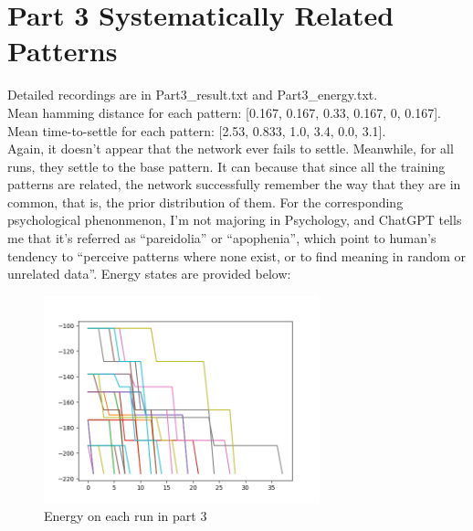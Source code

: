 \documentclass{article}
\begin{document}
\section*{Part 3 Systematically Related Patterns}
Detailed recordings are in Part3\_result.txt and Part3\_energy.txt.\\
Mean hamming distance for each pattern: [0.167, 0.167, 0.33, 0.167, 0, 0.167].\\
Mean time-to-settle for each pattern: [2.53, 0.833, 1.0, 3.4, 0.0, 3.1].\\
Again, it doesn't appear that the network ever fails to settle. Meanwhile, for all runs, they settle to the base pattern.
It can because that since all the training patterns are related, the network successfully remember the way that they are in common, that is, the prior distribution of them.
For the corresponding psychological phenonmenon, I'm not majoring in Psychology, and ChatGPT tells me that it's referred as ``pareidolia'' or ``apophenia'', which point to human's tendency to ``perceive patterns where none exist, or to find meaning in random or unrelated data''.
Energy states are provided below:
\begin{figure}[h]
    \centering
    \includegraphics[width=8cm]{Part3energy}
    \caption{Energy on each run in part 3}
\end{figure}\\
\end{document}
